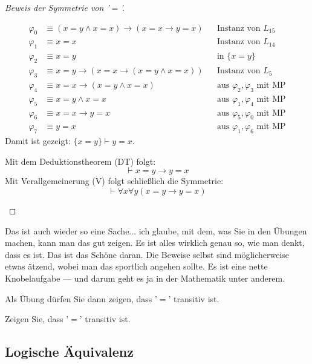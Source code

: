 \begin{proof}[Beweis der Symmetrie von '$=$']
\begin{math-stroke}
\begin{align*}
\varphi_0 &\equiv (x=y \land x=x) \to (x=x \to y=x) && \text{Instanz von } L_{15} \\
\varphi_1 &\equiv x = x && \text{Instanz von } L_{14} \\
\varphi_2 &\equiv x = y && \text{in } \{x=y\} \\
\varphi_3 &\equiv x=y \to (x=x \to (x=y \land x=x)) && \text{Instanz von } L_5 \\
\varphi_4 &\equiv x=x \to (x=y \land x=x) && \text{aus } \varphi_2, \varphi_3 \text{ mit MP} \\
\varphi_5 &\equiv x=y \land x=x && \text{aus } \varphi_1, \varphi_4 \text{ mit MP} \\
\varphi_6 &\equiv x=x \to y=x && \text{aus } \varphi_5, \varphi_0 \text{ mit MP} \\
\varphi_7 &\equiv y=x && \text{aus } \varphi_1, \varphi_6 \text{ mit MP}
\end{align*}
Damit ist gezeigt: $\{x = y\} \vdash y = x$.

Mit dem Deduktionstheorem (DT) folgt:
\[
\vdash x=y \to y=x
\]
Mit Verallgemeinerung (V) folgt schließlich die Symmetrie:
\[
\vdash \forall x \forall y (x=y \to y=x)
\]
\end{math-stroke}
\end{proof}

\begin{spoken-clean}[01:06:15 - 01:07:47]
Das ist auch wieder so eine Sache... ich glaube, mit dem, was Sie in den Übungen machen, kann man das gut zeigen. Es ist alles wirklich genau so, wie man denkt, dass es ist. Das ist das Schöne daran. Die Beweise selbst sind möglicherweise etwas ätzend, wobei man das sportlich angehen sollte. Es ist eine nette Knobelaufgabe --- und darum geht es ja in der Mathematik unter anderem.

Als Übung dürfen Sie dann zeigen, dass '$=$' transitiv ist.
\end{spoken-clean}

\begin{nice-box}[Übung]
Zeigen Sie, dass '$=$' transitiv ist.
\end{nice-box}

\subsection{Logische Äquivalenz}

